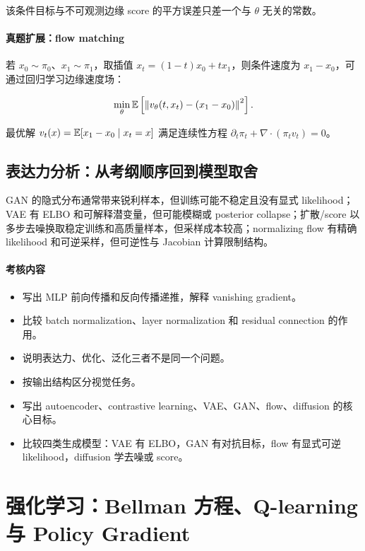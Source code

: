 \documentclass[11pt]{ctexart}
\begin{document}
该条件目标与不可观测边缘 score 的平方误差只差一个与 \(\theta\) 无关的常数。

\paragraph{真题扩展：flow matching}

若 \(x_0\sim\pi_0\)、\(x_1\sim\pi_1\)，取插值 \(x_t=(1-t)x_0+tx_1\)，则条件速度为 \(x_1-x_0\)，可通过回归学习边缘速度场：

\[
  \min_\theta\mathbb{E}\left[\left\|v_\theta(t,x_t)-(x_1-x_0)\right\|^2\right].
\]

最优解 \(v_t(x)=\mathbb{E}[x_1-x_0\mid x_t=x]\) 满足连续性方程 \(\partial_t\pi_t+\nabla\cdot(\pi_t v_t)=0\)。

\subsection{表达力分析：从考纲顺序回到模型取舍}

GAN 的隐式分布通常带来锐利样本，但训练可能不稳定且没有显式 likelihood；VAE 有 ELBO 和可解释潜变量，但可能模糊或 posterior collapse；扩散/score 以多步去噪换取稳定训练和高质量样本，但采样成本较高；normalizing flow 有精确 likelihood 和可逆采样，但可逆性与 Jacobian 计算限制结构。

\paragraph{考核内容}

\begin{itemize}
  \item 写出 MLP 前向传播和反向传播递推，解释 vanishing gradient。
  \item 比较 batch normalization、layer normalization 和 residual connection 的作用。
  \item 说明表达力、优化、泛化三者不是同一个问题。
  \item 按输出结构区分视觉任务。
  \item 写出 autoencoder、contrastive learning、VAE、GAN、flow、diffusion 的核心目标。
  \item 比较四类生成模型：VAE 有 ELBO，GAN 有对抗目标，flow 有显式可逆 likelihood，diffusion 学去噪或 score。
\end{itemize}

\section{强化学习：Bellman 方程、Q-learning 与 Policy Gradient}
\end{document}
